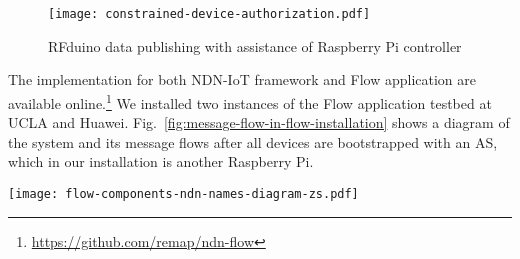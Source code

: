 \begin{figure}[!t]
\centering
\texttt{[image: constrained-device-authorization.pdf]}
\caption{RFduino data publishing with assistance of Raspberry Pi controller}
\label{fig:contrained-devices-bootstrap}
\end{figure}

The implementation for both NDN-IoT framework and Flow application are available online.\footnote{\url{https://github.com/remap/ndn-flow}} We installed two instances of the Flow application testbed at UCLA and Huawei. Fig.~\ref{fig:message-flow-in-flow-installation} shows a diagram of the system and its message flows after all devices are bootstrapped with an AS, which in our installation is another Raspberry Pi.

\begin{figure*}[!t]
\centering
\texttt{[image: flow-components-ndn-names-diagram-zs.pdf]}
\caption{Application components and message flows in Flow}
\label{fig:message-flow-in-flow-installation}
\end{figure*}



